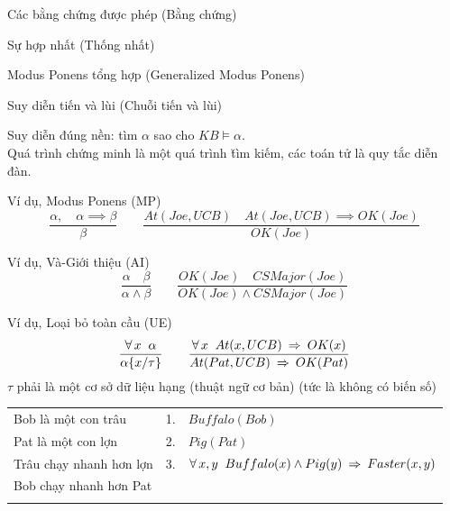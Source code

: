 \documentclass[fleqn]{article}
\begin{document}
\begin{huge}


\blob Các bằng chứng được phép (Bằng chứng)

\blob Sự hợp nhất (Thống nhất)

\blob Modus Ponens tổng hợp (Generalized Modus Ponens)

\blob Suy diễn tiến và lùi (Chuỗi tiến và lùi)



Suy diễn đúng nền: tìm $\alpha$ sao cho $KB \models \alpha$.\\
Quá trình chứng minh là một quá trình \u{tìm kiếm}, các toán tử là quy tắc diễn đàn.

Ví dụ, Modus Ponens (MP)
\[\displaystyle
\frac{\alpha,\quad \alpha\implies\beta}{\beta} \qquad
\frac{At(Joe,UCB)\quad At(Joe,UCB)\implies OK(Joe)}{OK(Joe)}
\]

Ví dụ, Và-Giới thiệu (AI)
\[\displaystyle
\frac{\alpha \quad \beta}{\alpha \land \beta} \qquad
\frac{OK(Joe)\quad CSMajor(Joe)}{OK(Joe)\land CSMajor(Joe)}
\]

Ví dụ, Loại bỏ toàn cầu (UE)
\[\displaystyle
\frac{\forall\,x\;\; \alpha}{\alpha\{x/\tau\}} \qquad
\frac{\forall\,x\;\; At(x,UCB)\:\;{\Rightarrow}\:\; OK(x)}{At(Pat,UCB)\:\;{\Rightarrow}\:\; OK(Pat)}
\]
$\tau$ phải là một cơ sở dữ liệu hạng (thuật ngữ cơ bản) (tức là không có biến số)







\begin{tabular}{l|ll}
Bob là một con trâu & 1. & $Buffalo(Bob)$ \\
Pat là một con lợn & 2. & $Pig(Pat)$ \\
Trâu chạy nhanh hơn lợn & 3. & $\forall\,x,y\;\; Buffalo(x) \land Pig(y) \:\;{\Rightarrow}\:\; Faster(x,y)$\\
\hline
Bob chạy nhanh hơn Pat & &\phantom{$Buffalo(Bob) \land Pig(Pat) \implies Faster(Bob,Pat)$}\\
\phantom{UE 3, $\{x/Bob,y/Pat\}$} & & \\
\end{tabular}


\end{huge}
\end{document}
